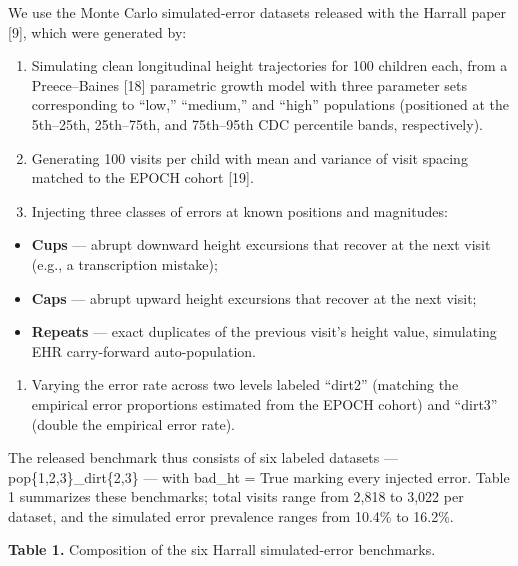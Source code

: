 \documentclass[11pt]{article}
\begin{document}
We use the Monte Carlo simulated-error datasets released with the Harrall paper [9], which were generated by:

\begin{enumerate}
\def\labelenumi{\arabic{enumi}.}
\item
  Simulating clean longitudinal height trajectories for 100 children each, from a Preece--Baines [18] parametric growth model with three parameter sets corresponding to ``low,'' ``medium,'' and ``high'' populations (positioned at the 5th--25th, 25th--75th, and 75th--95th CDC percentile bands, respectively).
\item
  Generating 100 visits per child with mean and variance of visit spacing matched to the EPOCH cohort [19].
\item
  Injecting three classes of errors at known positions and magnitudes:
\end{enumerate}

\begin{itemize}
\item
  \textbf{Cups} --- abrupt downward height excursions that recover at the next visit (e.g., a transcription mistake);
\item
  \textbf{Caps} --- abrupt upward height excursions that recover at the next visit;
\item
  \textbf{Repeats} --- exact duplicates of the previous visit's height value, simulating EHR carry-forward auto-population.
\end{itemize}

\begin{enumerate}
\def\labelenumi{\arabic{enumi}.}
\setcounter{enumi}{3}
\item
  Varying the error rate across two levels labeled ``dirt2'' (matching the empirical error proportions estimated from the EPOCH cohort) and ``dirt3'' (double the empirical error rate).
\end{enumerate}

The released benchmark thus consists of six labeled datasets --- pop\{1,2,3\}\_dirt\{2,3\} --- with bad\_ht = True marking every injected error. Table 1 summarizes these benchmarks; total visits range from 2,818 to 3,022 per dataset, and the simulated error prevalence ranges from 10.4\% to 16.2\%.

\textbf{Table 1.} Composition of the six Harrall simulated-error benchmarks.
\end{document}
